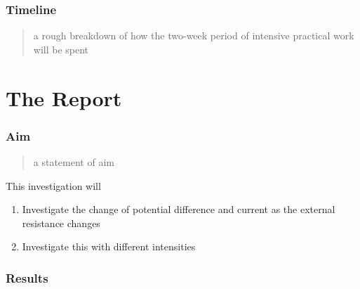 \documentclass{article}
\begin{document}
\section{Timeline}
\begin{quote}
a rough breakdown of how the two-week period of intensive practical work will be spent
\end{quote}
\pagebreak [4]
\part{The Report}

\section{Aim}
\begin{quote}
  a statement of aim
\end{quote}
This investigation will
\begin{enumerate}
  \item Investigate the change of potential difference and current as the external resistance changes
  \item Investigate this with different intensities
\end{enumerate}

\section{Results}
\end{document}
